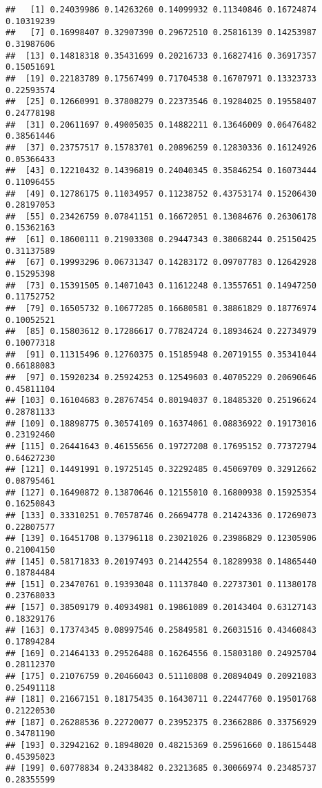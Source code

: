 \documentclass[
]{article}
\begin{document}
\begin{verbatim}
##   [1] 0.24039986 0.14263260 0.14099932 0.11340846 0.16724874 0.10319239
##   [7] 0.16998407 0.32907390 0.29672510 0.25816139 0.14253987 0.31987606
##  [13] 0.14818318 0.35431699 0.20216733 0.16827416 0.36917357 0.15051691
##  [19] 0.22183789 0.17567499 0.71704538 0.16707971 0.13323733 0.22593574
##  [25] 0.12660991 0.37808279 0.22373546 0.19284025 0.19558407 0.24778198
##  [31] 0.20611697 0.49005035 0.14882211 0.13646009 0.06476482 0.38561446
##  [37] 0.23757517 0.15783701 0.20896259 0.12830336 0.16124926 0.05366433
##  [43] 0.12210432 0.14396819 0.24040345 0.35846254 0.16073444 0.11096455
##  [49] 0.12786175 0.11034957 0.11238752 0.43753174 0.15206430 0.28197053
##  [55] 0.23426759 0.07841151 0.16672051 0.13084676 0.26306178 0.15362163
##  [61] 0.18600111 0.21903308 0.29447343 0.38068244 0.25150425 0.31137589
##  [67] 0.19993296 0.06731347 0.14283172 0.09707783 0.12642928 0.15295398
##  [73] 0.15391505 0.14071043 0.11612248 0.13557651 0.14947250 0.11752752
##  [79] 0.16505732 0.10677285 0.16680581 0.38861829 0.18776974 0.10052521
##  [85] 0.15803612 0.17286617 0.77824724 0.18934624 0.22734979 0.10077318
##  [91] 0.11315496 0.12760375 0.15185948 0.20719155 0.35341044 0.66188083
##  [97] 0.15920234 0.25924253 0.12549603 0.40705229 0.20690646 0.45811104
## [103] 0.16104683 0.28767454 0.80194037 0.18485320 0.25196624 0.28781133
## [109] 0.18898775 0.30574109 0.16374061 0.08836922 0.19173016 0.23192460
## [115] 0.26441643 0.46155656 0.19727208 0.17695152 0.77372794 0.64627230
## [121] 0.14491991 0.19725145 0.32292485 0.45069709 0.32912662 0.08795461
## [127] 0.16490872 0.13870646 0.12155010 0.16800938 0.15925354 0.16250843
## [133] 0.33310251 0.70578746 0.26694778 0.21424336 0.17269073 0.22807577
## [139] 0.16451708 0.13796118 0.23021026 0.23986829 0.12305906 0.21004150
## [145] 0.58171833 0.20197493 0.21442554 0.18289938 0.14865440 0.18784484
## [151] 0.23470761 0.19393048 0.11137840 0.22737301 0.11380178 0.23768033
## [157] 0.38509179 0.40934981 0.19861089 0.20143404 0.63127143 0.18329176
## [163] 0.17374345 0.08997546 0.25849581 0.26031516 0.43460843 0.17894284
## [169] 0.21464133 0.29526488 0.16264556 0.15803180 0.24925704 0.28112370
## [175] 0.21076759 0.20466043 0.51110808 0.20894049 0.20921083 0.25491118
## [181] 0.21667151 0.18175435 0.16430711 0.22447760 0.19501768 0.21220530
## [187] 0.26288536 0.22720077 0.23952375 0.23662886 0.33756929 0.34781190
## [193] 0.32942162 0.18948020 0.48215369 0.25961660 0.18615448 0.45395023
## [199] 0.60778834 0.24338482 0.23213685 0.30066974 0.23485737 0.28355599

\end{verbatim}
\end{document}
